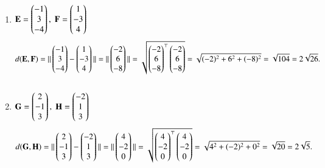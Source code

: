 \documentclass[journal,12pt,onecolumn]{IEEEtran}
\begin{document}
\begin{enumerate}
\item $\mathbf{E} = \begin{pmatrix}-1\\3\\-4\end{pmatrix}, \;\mathbf{F} = \begin{pmatrix}1\\-3\\4\end{pmatrix}$
\begin{align*}
d(\mathbf{E},\mathbf{F}) &= \|\begin{pmatrix}-1\\3\\-4\end{pmatrix}-\begin{pmatrix}1\\-3\\4\end{pmatrix}\|
= \|\begin{pmatrix}-2\\6\\-8\end{pmatrix}\| = \sqrt{\begin{pmatrix}-2\\6\\-8\end{pmatrix}^\top\begin{pmatrix}-2\\6\\-8\end{pmatrix}} = \sqrt{(-2)^2+6^2+(-8)^2} = \sqrt{104} = 2\sqrt{26}. \\[10pt]
\end{align*}
\item $\mathbf{G} = \begin{pmatrix}2\\-1\\3\end{pmatrix}, \;\mathbf{H} = \begin{pmatrix}-2\\1\\3\end{pmatrix}$
\begin{align*}
d(\mathbf{G},\mathbf{H}) &= \|\begin{pmatrix}2\\-1\\3\end{pmatrix}-\begin{pmatrix}-2\\1\\3\end{pmatrix}\|
= \|\begin{pmatrix}4\\-2\\0\end{pmatrix}\| = \sqrt{\begin{pmatrix}4\\-2\\0\end{pmatrix}^\top\begin{pmatrix}4\\-2\\0\end{pmatrix}} = \sqrt{4^2+(-2)^2+0^2} = \sqrt{20} = 2\sqrt{5}.
\end{align*}
\end{enumerate}
\end{document}
